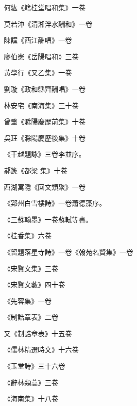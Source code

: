 \begin{pinyinscope}
 何紘《籍桂堂唱和集》一卷



 莫若沖《清湘泮水酬和》一卷



 陳讜《西江酬唱》一卷



 廖伯憲《岳陽唱和》三卷



 黃學行《又乙集》一卷



 劉璇《政和縣齊酬唱》一卷



 林安宅《南海集》三十卷



 曾肇《滁陽慶歷前集》十卷



 吳玨《滁陽慶歷後集》十卷



 《干越題詠》三卷李並序。



 郝篪《都梁
 集》十卷



 西湖寓隱《回文類聚》一卷



 《郢州白雪樓詩》一卷蕭德藻序。



 《三蘇翰墨》一卷蘇軾等書。



 《桂香集》六卷



 《留題落星寺詩》一卷《翰苑名賢集》一卷



 《宋賢文集》三卷



 《宋賢文藪》四十卷



 《先容集》一卷



 《制誥章表》二卷



 又《制誥章表》十五卷



 《儒林精選時文》十六卷



 《玉堂詩》三十六卷



 《辭林類蒿》三卷



 《海南集》十八卷




\end{pinyinscope}
